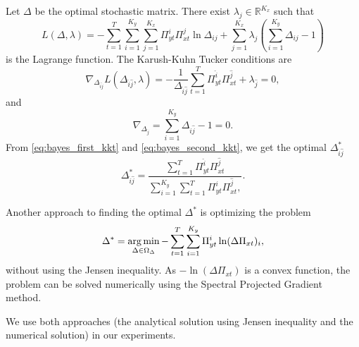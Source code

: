 Let $\Delta$ be the optimal stochastic matrix. There exist $\lambda_j \in \mathbb{R}^{K_x}$ such that
\begin{equation}
    L(\Delta, \lambda) = - \sum_{t=1}^T \sum_{i=1}^{K_y} \sum_{j=1}^{K_x} \Pi_{yt}^i \Pi_{xt}^j \ln \Delta_{ij} + \sum_{j=1}^{K_x} \lambda_j (\sum_{i=1}^{K_y} \Delta_{ij} - 1)
\end{equation}
is the Lagrange function. The Karush-Kuhn Tucker conditions are
\begin{equation}
    \nabla_{\Delta_{\hat{i}\hat{j}}} L(\Delta_{\hat{i}\hat{j}}, \lambda) = - \frac{1}{\Delta_{\hat{i}\hat{j}}} \sum_{t=1}^{T} \Pi_{yt}^{\hat{i}} \Pi_{xt}^{\hat{j}} + \lambda_{\hat{j}} = 0,
    \label{eq:bayes_first_kkt}
\end{equation}
and
\begin{equation}
    \nabla_{\Delta_{\hat{j}}} = \sum_{i=1}^{K_y} \Delta_{i\hat{j}} - 1 = 0.
    \label{eq:bayes_second_kkt}
\end{equation}
From \eqref{eq:bayes_first_kkt} and \eqref{eq:bayes_second_kkt}, we get the optimal $\Delta_{\hat{i}\hat{j}}^*$
\begin{equation}
    \Delta_{\hat{i}\hat{j}}^{*} = \frac{\sum_{t=1}^{T} \Pi_{yt}^{\hat{i}} \Pi_{xt}^{\hat{j}}}{\sum_{i=1}^{K_y} \sum_{t=1}^{T} \Pi_{yt}^{i} \Pi_{xt}^{\hat{j}},}.
\end{equation}

Another approach to finding the optimal $\Delta^{*}$ is optimizing the problem
\begin{equation}
    \Delta^* = \operatorname*{arg\,min}_{\Delta \in \Omega_{\Delta}} - \sum_{t=1}^T \sum_{i=1}^{K_y} \Pi_{yt}^i \ln (\Delta\Pi_{xt})_i,
\end{equation}
without using the Jensen inequality.
As $-\ln(\Delta\Pi_{xt})$ is a convex function, the problem can be solved numerically using the Spectral Projected Gradient method\cite{birgin2000}.

We use both approaches (the analytical solution using Jensen inequality and the numerical solution) in our experiments.
